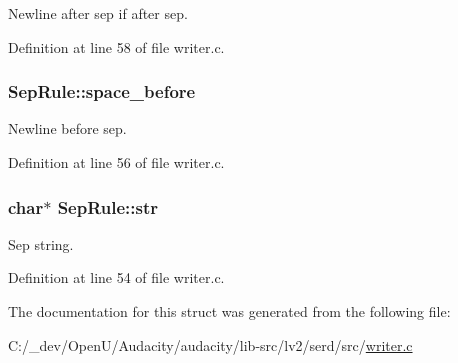 Newline after sep if after sep. 



Definition at line 58 of file writer.\+c.

\subsubsection[{\texorpdfstring{space\+\_\+before}{space_before}}]{ Sep\+Rule\+::space\+\_\+before}\hypertarget{struct_sep_rule_a153097be741a3553b7680af1ee9c3f1c}{}\label{struct_sep_rule_a153097be741a3553b7680af1ee9c3f1c}


Newline before sep. 



Definition at line 56 of file writer.\+c.

\subsubsection[{\texorpdfstring{str}{str}}]{ char$\ast$ Sep\+Rule\+::str}\hypertarget{struct_sep_rule_afb217cbb5878124afd5ef4eebeec8ee1}{}\label{struct_sep_rule_afb217cbb5878124afd5ef4eebeec8ee1}


Sep string. 



Definition at line 54 of file writer.\+c.



The documentation for this struct was generated from the following file\+:\begin{DoxyCompactItemize}
\item 
C\+:/\+\_\+dev/\+Open\+U/\+Audacity/audacity/lib-\/src/lv2/serd/src/\hyperlink{writer_8c}{writer.\+c}\end{DoxyCompactItemize}
